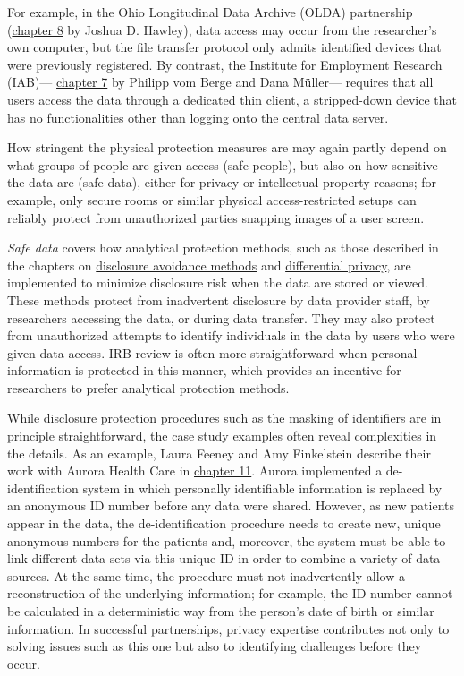 For example, in the Ohio Longitudinal Data Archive (OLDA) partnership (\protect\hyperlink{olda}{chapter 8} by Joshua D. Hawley), data access may occur from the researcher's own computer, but the file transfer protocol only admits identified devices that were previously registered. By contrast, the Institute for Employment Research (IAB)--- \protect\hyperlink{iab}{chapter 7} by Philipp vom Berge and Dana Müller--- requires that all users access the data through a dedicated thin client, a stripped-down device that has no functionalities other than logging onto the central data server.

How stringent the physical protection measures are may again partly depend on what groups of people are given access (safe people), but also on how sensitive the data are (safe data), either for privacy or intellectual property reasons; for example, only secure rooms or similar physical access-restricted setups can reliably protect from unauthorized parties snapping images of a user screen.

\emph{Safe data} covers how analytical protection methods, such as those described in the chapters on \protect\hyperlink{discavoid}{disclosure avoidance methods} and \protect\hyperlink{diffpriv}{differential privacy}, are implemented to minimize disclosure risk when the data are stored or viewed. These methods protect from inadvertent disclosure by data provider staff, by researchers accessing the data, or during data transfer. They may also protect from unauthorized attempts to identify individuals in the data by users who were given data access. IRB review is often more straightforward when personal information is protected in this manner, which provides an incentive for researchers to prefer analytical protection methods.

While disclosure protection procedures such as the masking of identifiers are in principle straightforward, the case study examples often reveal complexities in the details. As an example, Laura Feeney and Amy Finkelstein describe their work with Aurora Health Care in \protect\hyperlink{ahc}{chapter 11}. Aurora implemented a de-identification system in which personally identifiable information is replaced by an anonymous ID number before any data were shared. However, as new patients appear in the data, the de-identification procedure needs to create new, unique anonymous numbers for the patients and, moreover, the system must be able to link different data sets via this unique ID in order to combine a variety of data sources. At the same time, the procedure must not inadvertently allow a reconstruction of the underlying information; for example, the ID number cannot be calculated in a deterministic way from the person's date of birth or similar information. In successful partnerships, privacy expertise contributes not only to solving issues such as this one but also to identifying challenges before they occur.

